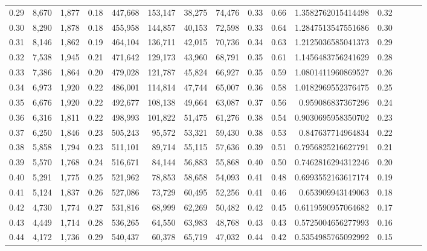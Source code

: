 \begin{tabular}{rrrrrrrrrrrrrrr}
0.29 &   8,670 &  1,877 &  0.18 &  447,668 &  153,147 &   38,275 &   74,476 &  0.33 &  0.66 &     1.3582762015414498 &      0.32 \\
0.30 &   8,290 &  1,878 &  0.18 &  455,958 &  144,857 &   40,153 &   72,598 &  0.33 &  0.64 &     1.2847513547551686 &      0.30 \\
0.31 &   8,146 &  1,862 &  0.19 &  464,104 &  136,711 &   42,015 &   70,736 &  0.34 &  0.63 &     1.2125036585041373 &      0.29 \\
0.32 &   7,538 &  1,945 &  0.21 &  471,642 &  129,173 &   43,960 &   68,791 &  0.35 &  0.61 &     1.1456483756241629 &      0.28 \\
0.33 &   7,386 &  1,864 &  0.20 &  479,028 &  121,787 &   45,824 &   66,927 &  0.35 &  0.59 &     1.0801411960869527 &      0.26 \\
0.34 &   6,973 &  1,920 &  0.22 &  486,001 &  114,814 &   47,744 &   65,007 &  0.36 &  0.58 &     1.0182969552376475 &      0.25 \\
0.35 &   6,676 &  1,920 &  0.22 &  492,677 &  108,138 &   49,664 &   63,087 &  0.37 &  0.56 &      0.959086837367296 &      0.24 \\
0.36 &   6,316 &  1,811 &  0.22 &  498,993 &  101,822 &   51,475 &   61,276 &  0.38 &  0.54 &     0.9030695958350702 &      0.23 \\
0.37 &   6,250 &  1,846 &  0.23 &  505,243 &   95,572 &   53,321 &   59,430 &  0.38 &  0.53 &      0.847637714964834 &      0.22 \\
0.38 &   5,858 &  1,794 &  0.23 &  511,101 &   89,714 &   55,115 &   57,636 &  0.39 &  0.51 &     0.7956825216627791 &      0.21 \\
0.39 &   5,570 &  1,768 &  0.24 &  516,671 &   84,144 &   56,883 &   55,868 &  0.40 &  0.50 &     0.7462816294312246 &      0.20 \\
0.40 &   5,291 &  1,775 &  0.25 &  521,962 &   78,853 &   58,658 &   54,093 &  0.41 &  0.48 &     0.6993552163617174 &      0.19 \\
0.41 &   5,124 &  1,837 &  0.26 &  527,086 &   73,729 &   60,495 &   52,256 &  0.41 &  0.46 &      0.653909943149063 &      0.18 \\
0.42 &   4,730 &  1,774 &  0.27 &  531,816 &   68,999 &   62,269 &   50,482 &  0.42 &  0.45 &     0.6119590957064682 &      0.17 \\
0.43 &   4,449 &  1,714 &  0.28 &  536,265 &   64,550 &   63,983 &   48,768 &  0.43 &  0.43 &     0.5725004656277993 &      0.16 \\
0.44 &   4,172 &  1,736 &  0.29 &  540,437 &   60,378 &   65,719 &   47,032 &  0.44 &  0.42 &     0.5354985765092992 &      0.15 \\

\end{tabular}
